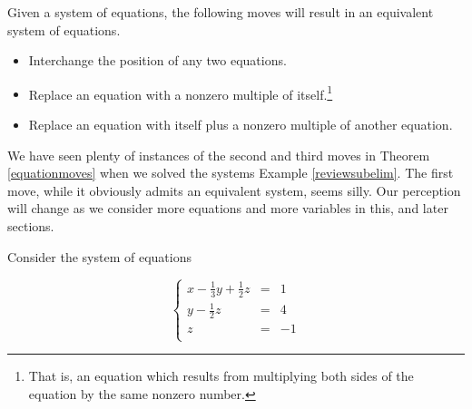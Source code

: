 \smallskip

\colorbox{ResultColor}{\bbm

\begin{thm}  \label{equationmoves} Given a system of equations, the following moves will result in an equivalent system of equations.

\begin{itemize}

\item  Interchange the position of any two equations.

\item  Replace an equation with a nonzero multiple of itself.\footnote{That is, an equation which results from multiplying both sides of the equation by the same nonzero number.}

\item  Replace an equation with itself plus a nonzero multiple of another equation.


\end{itemize}

\end{thm}  

\ebm}

\smallskip

We have seen plenty of instances of the second and third moves in Theorem \ref{equationmoves} when we solved the systems Example \ref{reviewsubelim}. The first move, while it obviously admits an equivalent system, seems silly.  Our perception will change as we consider more equations and more variables in this, and later sections.

\smallskip

Consider the system of equations 

\[ \left\{ \begin{array}{rcr} x-\frac{1}{3}y+\frac{1}{2}z  & = & 1 \\ [3pt]
y - \frac{1}{2} z & = & 4 \\ [3pt]
z & = & -1 \\ \end{array} \right.\]  

